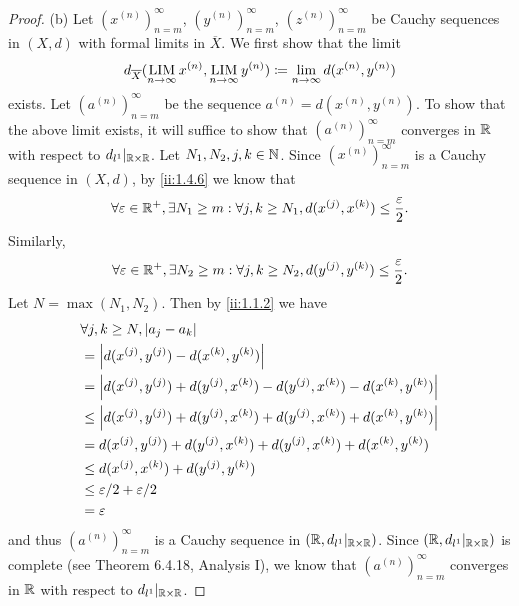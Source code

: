 \begin{proof}{(b)}
  Let \((x^{(n)})_{n = m}^\infty\), \((y^{(n)})_{n = m}^\infty\), \((z^{(n)})_{n = m}^\infty\) be Cauchy sequences in \((X, d)\) with formal limits in \(\overline{X}\).
  We first show that the limit
  \[
    d_{\overline{X}}(\operatorname*{LIM}_{n \to \infty} x^{(n)}, \operatorname*{LIM}_{n \to \infty} y^{(n)}) \coloneqq \lim_{n \to \infty} d(x^{(n)}, y^{(n)})
  \]
  exists.
  Let \((a^{(n)})_{n = m}^\infty\) be the sequence \(a^{(n)} = d(x^{(n)}, y^{(n)})\).
  To show that the above limit exists, it will suffice to show that \((a^{(n)})_{n = m}^\infty\) converges in \(\mathbb{R}\) with respect to \(d_{l^1}|_{\mathbb{R} \times \mathbb{R}}\).
  Let \(N_1, N_2, j, k \in \mathbb{N}\).
  Since \((x^{(n)})_{n = m}^\infty\) is a Cauchy sequence in \((X, d)\), by \cref{ii:1.4.6} we know that
  \[
    \forall \varepsilon \in \mathbb{R}^+, \exists N_1 \geq m : \forall j, k \geq N_1, d(x^{(j)}, x^{(k)}) \leq \dfrac{\varepsilon}{2}.
  \]
  Similarly,
  \[
    \forall \varepsilon \in \mathbb{R}^+, \exists N_2 \geq m : \forall j, k \geq N_2, d(y^{(j)}, y^{(k)}) \leq \dfrac{\varepsilon}{2}.
  \]
  Let \(N = \max(N_1, N_2)\).
  Then by \cref{ii:1.1.2} we have
  \begin{align*}
     & \forall j, k \geq N, \left\lvert a_j - a_k\right\rvert                                                             \\
     & = \left\lvert d(x^{(j)}, y^{(j)}) - d(x^{(k)}, y^{(k)})\right\rvert                                                \\
     & = \left\lvert d(x^{(j)}, y^{(j)}) + d(y^{(j)}, x^{(k)}) - d(y^{(j)}, x^{(k)}) - d(x^{(k)}, y^{(k)})\right\rvert    \\
     & \leq \left\lvert d(x^{(j)}, y^{(j)}) + d(y^{(j)}, x^{(k)}) + d(y^{(j)}, x^{(k)}) + d(x^{(k)}, y^{(k)})\right\rvert \\
     & = d(x^{(j)}, y^{(j)}) + d(y^{(j)}, x^{(k)}) + d(y^{(j)}, x^{(k)}) + d(x^{(k)}, y^{(k)})          \\
     & \leq d(x^{(j)}, x^{(k)}) + d(y^{(j)}, y^{(k)})                                                   \\
     & \leq \varepsilon / 2 + \varepsilon / 2                                                           \\
     & = \varepsilon
  \end{align*}
  and thus \((a^{(n)})_{n = m}^\infty\) is a Cauchy sequence in \((\mathbb{R}, d_{l^1}|_{\mathbb{R} \times \mathbb{R}})\).
  Since \((\mathbb{R}, d_{l^1}|_{\mathbb{R} \times \mathbb{R}})\) is complete (see Theorem 6.4.18, Analysis I), we know that \((a^{(n)})_{n = m}^\infty\) converges in \(\mathbb{R}\) with respect to \(d_{l^1}|_{\mathbb{R} \times \mathbb{R}}\).


\end{proof}

